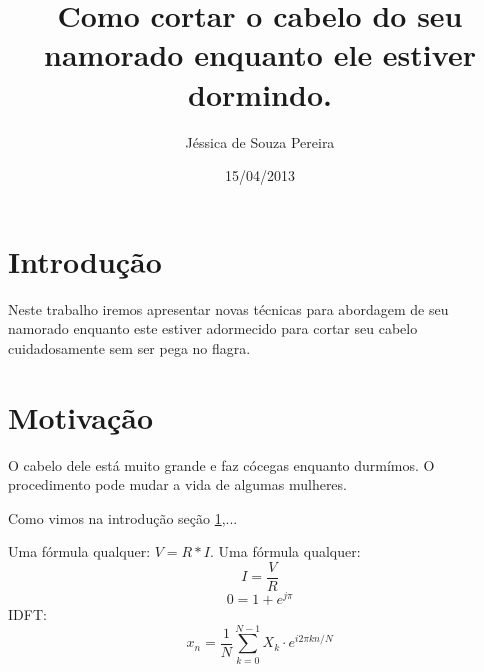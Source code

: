 \documentclass{article}
\author{Jéssica de Souza Pereira}
\date{15/04/2013}
\title{Como cortar o cabelo do seu namorado enquanto ele estiver dormindo.}
\begin{document}
\maketitle
\newpage
\section{Introdução}
\label{sec:intro}
Neste trabalho iremos apresentar novas técnicas para abordagem de seu namorado enquanto este estiver adormecido para cortar seu cabelo cuidadosamente sem ser pega no flagra.
\section{Motivação}
\label{sec:motiv}
O cabelo dele está muito grande e faz cócegas enquanto durmímos. O procedimento pode mudar a vida de algumas mulheres.

Como vimos na introdução {seção \ref{sec:intro}},...

Uma fórmula qualquer: $V = R*I$.
Uma fórmula qualquer: $$I = \frac{V}{R}$$
$$0=1+e^{j\pi}$$
IDFT:
\begin{equation}
x_n = \frac{1}{N}\sum_{k = 0}^{N-1} X_k \cdot e^{i2\pi kn/N}
\end{equation}
\end{document}
